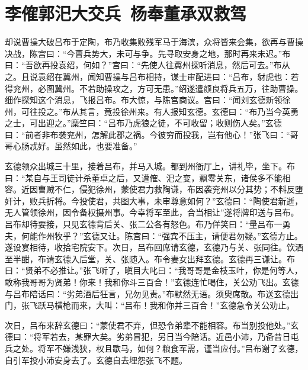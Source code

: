 \chapter{李傕郭汜大交兵~杨奉董承双救驾}

却说曹操大破吕布于定陶，布乃收集败残军马于海滨，众将皆来会集，欲再与曹操决战，陈宫曰：“今曹兵势大，未可与争。先寻取安身之地，那时再来未迟。”布曰：“吾欲再投袁绍，何如？”宫曰：“先使人往冀州探听消息，然后可去。”布从之。且说袁绍在冀州，闻知曹操与吕布相持，谋士审配进曰：“吕布，豺虎也：若得兖州，必图冀州。不若助操攻之，方可无患。”绍遂遣颜良将兵五万，往助曹操。细作探知这个消息，飞报吕布。布大惊，与陈宫商议。宫曰：“闻刘玄德新领徐州，可往投之。”布从其言，竟投徐州来。有人报知玄德。玄德曰：“布乃当今英勇之士，可出迎之。”糜竺曰：“吕布乃虎狼之徒，不可收留；收则伤人矣。”玄德曰：“前者非布袭兖州，怎解此郡之祸。今彼穷而投我，岂有他心！”张飞曰：“哥哥心肠忒好。虽然如此，也要准备。”

玄德领众出城三十里，接着吕布，并马入城。都到州衙厅上，讲礼毕，坐下。布曰：“某自与王司徒计杀董卓之后，又遭傕、汜之变，飘零关东，诸侯多不能相容。近因曹贼不仁，侵犯徐州，蒙使君力救陶谦，布因袭兖州以分其势；不料反堕奸计，败兵折将。今投使君，共图大事，未审尊意如何？”玄德曰：“陶使君新逝，无人管领徐州，因令备权摄州事。今幸将军至此，合当相让”遂将牌印送与吕布。吕布却待要接，只见玄德背后关、张二公各有怒色。布乃佯笑曰：“量吕布一勇夫，何能作州牧乎？”玄德又让。陈宫曰：“强宾不压主，请便君勿疑。”玄德方止。遂设宴相待，收拾宅院安下。次日，吕布回席请玄德，玄德乃与关、张同往。饮酒至半酣，布请玄德入后堂，关、张随入。布令妻女出拜玄德。玄德再三谦让。布曰：“贤弟不必推让。”张飞听了，瞋目大叱曰：“我哥哥是金枝玉叶，你是何等人，敢称我哥哥为贤弟！你来！我和你斗三百合！”玄德连忙喝住，关公劝飞出。玄德与吕布陪话曰：“劣弟酒后狂言，兄勿见责。”布默然无语。须臾席散。布送玄德出门，张飞跃马横枪而来，大叫：“吕布！我和你并三百合！”玄德急令关公劝止。

次日，吕布来辞玄德曰：“蒙使君不弃，但恐令弟辈不能相容。布当别投他处。”玄德曰：“将军若去，某罪大矣。劣弟冒犯，另日当今陪话。近邑小沛，乃备昔日屯兵之处。将军不嫌浅狭，权且歇马，如何？粮食军需，谨当应付。”吕布谢了玄德，自引军投小沛安身去了。玄德自去埋怨张飞不题。

